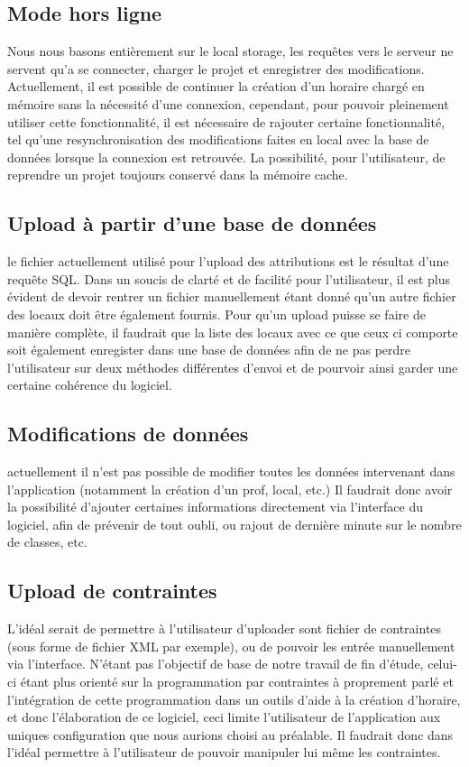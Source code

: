 \subsection{Mode hors ligne}
Nous nous basons entièrement sur le local storage, les requêtes vers le serveur ne
servent qu'a se connecter, charger le projet et enregistrer des modifications.
Actuellement, il est possible de continuer la création d'un horaire chargé en
mémoire sans la nécessité d'une connexion, cependant, pour pouvoir pleinement
utiliser cette fonctionnalité, il est nécessaire de rajouter certaine fonctionnalité, tel
qu'une resynchronisation des modifications faites en local avec la base de données lorsque la
connexion est retrouvée. La possibilité, pour l'utilisateur, de reprendre un projet toujours conservé dans la mémoire cache.

\subsection{Upload à partir d'une base de données}
le fichier actuellement utilisé pour l'upload des attributions est le résultat d'une requête SQL. Dans un soucis de clarté et de facilité pour l'utilisateur, il est plus évident de devoir rentrer un fichier manuellement étant donné qu'un autre fichier des locaux doit être également fournis. Pour qu'un upload puisse se faire de manière complète, il faudrait que la liste des locaux avec ce que ceux ci comporte soit également enregister dans une base de données afin de ne pas perdre l'utilisateur sur deux méthodes différentes d'envoi et de pourvoir ainsi garder une certaine cohérence du logiciel.

\subsection{Modifications de données}
actuellement il n'est pas possible de modifier toutes les données intervenant
dans l'application (notamment la création d'un prof, local, etc.) Il faudrait donc avoir la possibilité d'ajouter certaines informations directement via l'interface du logiciel, afin de prévenir de tout oubli, ou rajout de dernière minute sur le nombre de classes, etc.

\subsection{Upload de contraintes}
L'idéal serait de permettre à l'utilisateur d'uploader sont fichier de contraintes (sous forme de fichier XML par exemple), ou de pouvoir les entrée manuellement via l'interface. N'étant pas l'objectif de base de notre travail de fin d'étude, celui-ci étant plus orienté sur la programmation par contraintes à proprement parlé et l'intégration de cette programmation dans un outils d'aide à la création d'horaire, et donc l'élaboration de ce logiciel, ceci limite l'utilisateur de l'application aux uniques configuration que nous aurions choisi au préalable. Il faudrait donc dans l'idéal permettre à l'utilisateur de pouvoir manipuler lui même les contraintes.